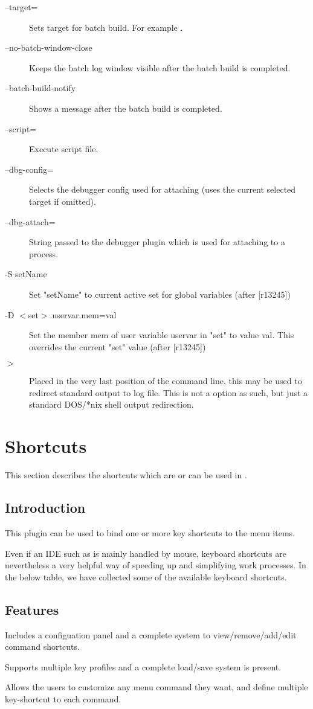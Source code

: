 \begin{description}
\item[--target=] Sets target for batch build. For example .
\item[--no-batch-window-close] Keeps the batch log window visible after the batch build is completed.
\item[--batch-build-notify] Shows a message after the batch build is completed.
\item[--script=] Execute script file.
\item[--dbg-config=] Selects the debugger config used for attaching (uses the current selected target if omitted).
\item[--dbg-attach=] String passed to the debugger plugin which is used for attaching to a process.
\item[-S setName] Set "setName" to current active set for global variables (after [r13245])
\item[-D $<$set$>$.uservar.mem=val] Set the member mem of user variable uservar in "set" to value val. This overrides the current "set" value (after [r13245])
\item[$>$ ] Placed in the very last position of the command line, this may be used to redirect standard output to log file. This is not a \codeblocks option as such, but just a standard DOS/*nix shell output redirection.
\end{description}

\section{Shortcuts}

This section describes the shortcuts which are or can be used in \codeblocks.

\subsection{Introduction}

This plugin can be used to bind one or more key shortcuts to the menu items.

Even if an IDE such as \codeblocks is mainly handled by mouse, keyboard shortcuts are nevertheless a very helpful way of speeding up and simplifying work processes. In the below table, we have collected some of the available keyboard shortcuts.

\subsection{Features}
\begin{description}
\item Includes a configuation panel and a complete system to view/remove/add/edit command shortcuts.
\item Supports multiple key profiles and a complete load/save system is present.
\item Allows the users to customize any menu command they want, and define multiple key-shortcut to each command.
\end{description}

